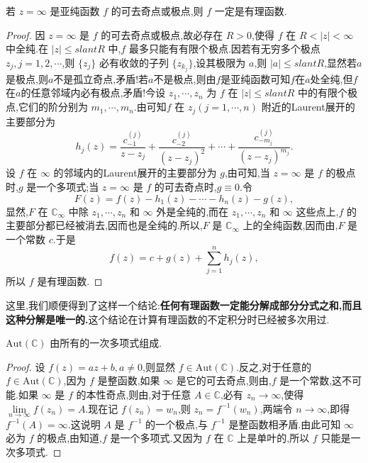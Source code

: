 \documentclass[../../main.tex]{subfiles}
\begin{document}
\begin{theorem}\label{theorem:定理5.3.3}
若 \( z = \infty \) 是亚纯函数 \( f \) 的可去奇点或极点,则 \( f \) 一定是有理函数.
\end{theorem}
\begin{proof}
因 \( z = \infty \) 是 \( f \) 的可去奇点或极点,故必存在 \( R > 0 \),使得 \( f \) 在 \( R < |z| < \infty \) 中全纯.在 \( |z| \leqslant slant R \) 中,\( f \) 最多只能有有限个极点.因若有无穷多个极点 \( z_j, j = 1, 2, \cdots \),则 \( \{ z_j \} \) 必有收敛的子列 \( \{ z_{k_j} \} \),设其极限为 \( a \),则 \( |a| \leqslant slant R \),显然若$a$是极点,则\( a \)不是孤立奇点,矛盾!若$a$不是极点,则由$f$是亚纯函数可知$f$在$a$处全纯,但$f$在$a$的任意邻域内必有极点,矛盾!今设 \( z_1, \cdots, z_n \) 为 \( f \) 在 \( |z| \leqslant slant R \) 中的有限个极点,它们的阶分别为 \( m_1, \cdots, m_n \).由可知\( f \) 在 \( z_j (j = 1, \cdots, n) \) 附近的Laurent展开的主要部分为
\[
h_j(z) = \frac{c_{-1}^{(j)}}{z - z_j} + \frac{c_{-2}^{(j)}}{(z - z_j)^2} + \cdots + \frac{c_{-m_j}^{(j)}}{(z - z_j)^{m_j}}.
\]
设 \( f \) 在 \( \infty \) 的邻域内的Laurent展开的主要部分为 \( g \),由可知,当 \( z = \infty \) 是 \( f \) 的极点时,\( g \) 是一个多项式;当 \( z = \infty \) 是 \( f \) 的可去奇点时,\( g \equiv 0 \).令
\[
F(z) = f(z) - h_1(z) - \cdots - h_n(z) - g(z),
\]
显然,\( F \) 在 \( \mathbb{C}_{\infty} \) 中除 \( z_1, \cdots, z_n \) 和 \( \infty \) 外是全纯的,而在 \( z_1, \cdots, z_n \) 和 \( \infty \) 这些点上,\( f \) 的主要部分都已经被消去,因而也是全纯的.所以,\( F \) 是 \( \mathbb{C}_{\infty} \) 上的全纯函数,因而由,\( F \) 是一个常数 \( c \).于是
\[
f(z) = c + g(z) + \sum_{j = 1}^{n} h_j(z),
\]
所以 \( f \) 是有理函数.
\end{proof}
\begin{remark}
这里,我们顺便得到了这样一个结论:\textbf{任何有理函数一定能分解成部分分式之和,而且这种分解是唯一的.}这个结论在计算有理函数的不定积分时已经被多次用过.
\end{remark}

\begin{theorem}\label{theorem:定理5.3.4}
\( \mathrm{Aut}(\mathbb{C}) \) 由所有的一次多项式组成.
\end{theorem}
\begin{proof}
设 \( f(z) = az + b, a \neq 0 \),则显然 \( f \in \mathrm{Aut}(\mathbb{C}) \).反之,对于任意的 \( f \in \mathrm{Aut}(\mathbb{C}) \),因为 \( f \) 是整函数,如果 \( \infty \) 是它的可去奇点,则由,\( f \) 是一个常数,这不可能.如果 \( \infty \) 是 \( f \) 的本性奇点,则由,对于任意 \( A \in \mathbb{C} \),必有 \( z_n \to \infty \),使得 \( \lim\limits_{n \to \infty} f(z_n) = A \).现在记 \( f(z_n) = w_n \),则 \( z_n = f^{-1}(w_n) \),两端令 \( n \to \infty \),即得 \( f^{-1}(A) = \infty \).这说明 \( A \) 是 \( f^{-1} \) 的一个极点,与 \( f^{-1} \) 是整函数相矛盾.由此可知 \( \infty \) 必为 \( f \) 的极点,由知道,\( f \) 是一个多项式.又因为 \( f \) 在 \( \mathbb{C} \) 上是单叶的,所以 \( f \) 只能是一次多项式.
\end{proof}
\end{document}
